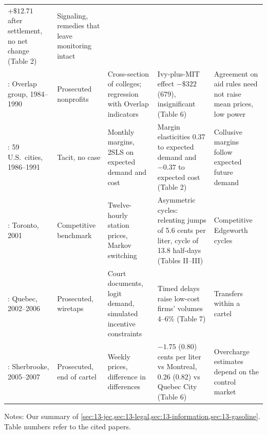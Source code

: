 \begin{table}[htbp]
\begin{tabularx}{\textwidth}{@{}>{\raggedright\arraybackslash}p{2.35cm}>{\raggedright\arraybackslash}p{1.7cm}>{\raggedright\arraybackslash}p{2.75cm}>{\raggedright\arraybackslash}X>{\raggedright\arraybackslash}p{3.0cm}@{}}
$+\$12.71$ after settlement, no net change (Table 2) & Signaling, remedies that leave monitoring intact\\
\addlinespace
\citet{CarltonBambergerEpstein1995}: Overlap group, 1984--1990 & Prosecuted nonprofits & Cross-section of colleges;
regression with Overlap indicators & Ivy-plus-MIT effect $-\$322$ (679), insignificant (Table 6) & Agreement on aid
rules need not raise mean prices, low power\\
\addlinespace
\citet{BorensteinShepard1996}: 59 U.S.\ cities, 1986--1991 & Tacit, no case & Monthly margins, 2SLS on expected demand
and cost & Margin elasticities 0.37 to expected demand and $-0.37$ to expected cost (Table 2) & Collusive margins
follow expected future demand\\
\addlinespace
\citet{Noel2007}: Toronto, 2001 & Competitive benchmark & Twelve-hourly station prices, Markov switching & Asymmetric
cycles: relenting jumps of 5.6 cents per liter, cycle of 13.8 half-days (Tables II--III) & Competitive Edgeworth
cycles\\
\addlinespace
\citet{ClarkHoude2013}: Quebec, 2002--2006 & Prosecuted, wiretaps & Court documents, logit demand, simulated incentive
constraints & Timed delays raise low-cost firms' volumes 4--6\% (Table 7) & Transfers within a cartel
\citep{HarringtonSkrzypacz2011}\\
\addlinespace
\citet{ErutkuHildebrand2010}: Sherbrooke, 2005--2007 & Prosecuted, end of cartel & Weekly prices, difference in
differences & $-1.75$ (0.80) cents per liter vs Montreal, 0.26 (0.82) vs Quebec City (Table 6) & Overcharge
estimates depend on the control market\\
\bottomrule
\end{tabularx}

\smallskip
\begin{minipage}{0.95\textwidth}\footnotesize
Notes: Our summary of \cref{sec:13-jec,sec:13-legal,sec:13-information,sec:13-gasoline}. Table numbers refer to
the cited papers.
\end{minipage}
\end{table}

